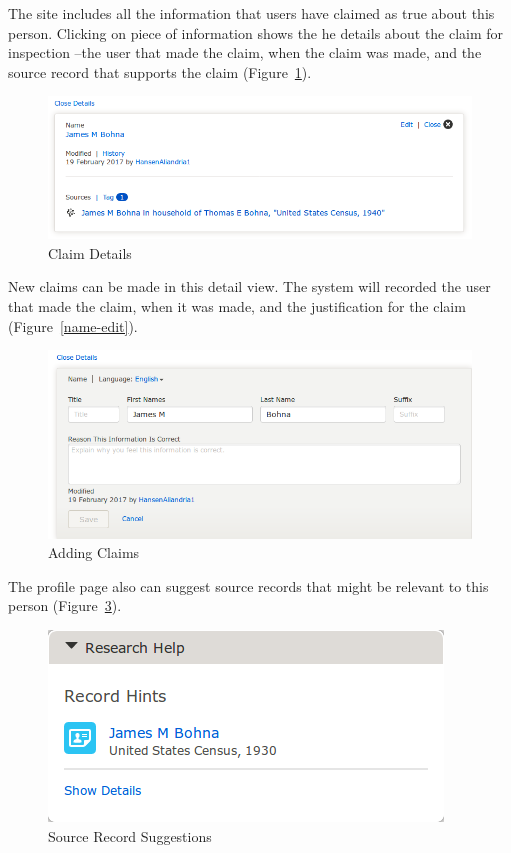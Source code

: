 \documentclass[format=siggraph, review=true]{acmart}
\begin{document}
The site includes all the information that users have claimed as true
about this person. Clicking on piece of information shows the he
details about the claim for inspection --the user that made the
claim, when the claim was made, and the source record that supports
the claim (Figure~\ref{fig:name-detail}).

\begin{figure}[h]
\includegraphics[width=\columnwidth]{images/familysearch/name-detail.png}
\caption{Claim Details}
\label{fig:name-detail}
\end{figure}

New claims can be made in this detail view. The system will recorded
the user that made the claim, when it was made, and the justification
for the claim (Figure~\ref{name-edit}).

\begin{figure}[h]
\includegraphics[width=\columnwidth]{images/familysearch/name-edit.png}
\caption{Adding Claims}
\label{fig:name-edit}
\end{figure}

The profile page also can suggest source records that might be
relevant to this person (Figure~\ref{fig:record-hint}).

\begin{figure}[h]
\includegraphics[width=\columnwidth]{images/familysearch/record-hint.png}
\caption{Source Record Suggestions}
\label{fig:record-hint}
\end{figure}
\end{document}
